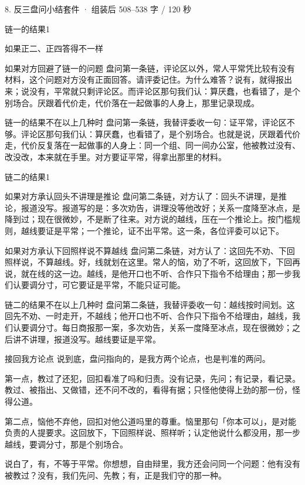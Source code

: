 \documentclass[script,con]{debate}
\begin{document}
\begin{kit}{8. 反三盘问小结}{套件 · 组装后 508–538 字 / 120 秒}
\begin{pick}{链一的结果}{1}
\begin{module}{如果正二、正四答得不一样}
\end{module}
\begin{module}{如果对方回避了链一的问题}
盘问第一条链，评论区以外，常人平常凭比较有没有材料，这个问题对方没有正面回答。请评委记住。为什么难答？说有，就得报出来；说没有，平常就只剩评论区。而评论区那句我们认：算厌蠢，也看错了，是个别场合。厌跟着代价走，代价落在一起做事的人身上，那里记录现成。
\end{module}
\begin{fallback}{链一的结果不在以上几种时}
盘问第一条链，我替评委收一句：证平常，评论区不够。评论区那句我们认：算厌蠢，也看错了，是个别场合。也就是说，厌跟着代价走，代价反复落在一起做事的人身上：同一个组、同一间办公室，他被教过没有、改没改，本来就在手里。对方要证平常，得拿出那里的材料。
\end{fallback}
\end{pick}
\begin{pick}{链二的结果}{1}
\begin{module}{如果对方承认回头不讲理是推论}
盘问第二条链，对方认了：回头不讲理，是推论，报道没写。报道写的是：多次劝告，讲理没等他改好；关系一度降至冰点，是降到过；现在很微妙，不是断了往来。对方说的越线，压在一个推论上。按门槛规则，越线要证是平常；一个推论，证不出平常。这一条，各位评委可以记下。
\end{module}
\begin{module}{如果对方承认下回照样说不算越线}
盘问第二条链，对方认了：这回先不劝、下回照样说，不算越线。好，线就划在这里。常人的恼，劝了不听，这回放下，下回再说，就在线的这一边。越线，是他开口也不听、合作只下指令不给理由；那一步我们认要调分寸，可它要证是平常，不能只证可能。
\end{module}
\begin{fallback}{链二的结果不在以上几种时}
盘问第二条链，我替评委收一句：越线按时间划。这回先不劝、一时走开，不越线；他开口也不听、合作只下指令不给理由，越线，我们认要调分寸。每日商报那一案，多次劝告，关系一度降至冰点，现在很微妙；之后讲不讲理，报道没写。越线要证是平常。
\end{fallback}
\end{pick}
\begin{fixed}{接回我方论点}
说到底，盘问指向的，是我方两个论点，也是判准的两问。

第一点，教过了还犯，回扣看准了吗和归责。没有记录，先问；有记录，看记录。教过、被指出、又做错，还不问不改的，看得有据；只怪他使得上劲的那一份，怪得公道。

第二点，恼他不弃他，回扣对他公道吗里的尊重。恼里那句「你本可以」，是对能负责的人提要求。这回放下，下回照样说、照样听；认定他说什么都没用，那一步越线，要调分寸，那是个别场合。

说白了，有，不等于平常。你想想，自由辩里，我方还会问同一个问题：他有没有被教过？没有，我们先问、先教；有，正是我们守的那一种。
\end{fixed}
\end{kit}
\end{document}
